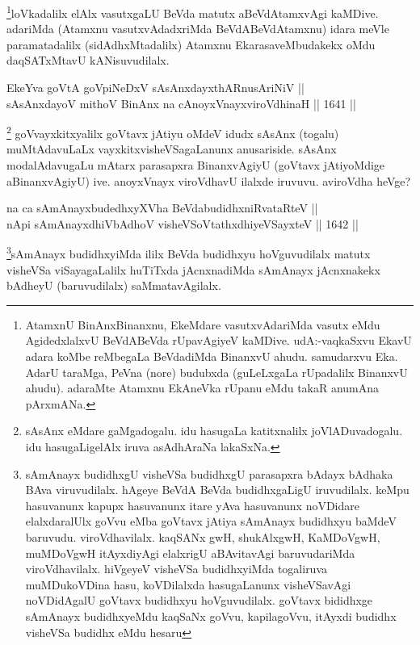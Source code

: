 \begin{artha}
\footnote{AtamxnU BinAnxBinanxnu, EkeMdare vasutxvAdariMda vasutx eMdu AgidedxlalxvU BeVdABeVda rUpavAgiyeV kaMDive. udA:-vaqkaSxvu EkavU adara koMbe reMbegaLa BeVdadiMda BinanxvU ahudu. samudarxvu Eka. AdarU taraMga, PeVna (nore) budubxda (guLeLxgaLa rUpadalilx BinanxvU ahudu). adaraMte Atamxnu EkAneVka rUpanu eMdu takaR anumAna pArxmANa.}loVkadalilx elAlx vasutxgaLU BeVda matutx aBeVdAtamxvAgi kaMDive. adariMda (Atamxnu vasutxvAdadxriMda BeVdABeVdAtamxnu) idara meVle paramatadalilx (sidAdhxMtadalilx) Atamxnu EkarasaveMbudakekx oMdu daqSATxMtavU kANisuvudilalx.
\end{artha}


\begin{shl}
EkeYva goVtA goVpiNeDxV sAsAnxdayxthARnusAriNiV || \\
sAsAnxdayoV mithoV BinAnx na cAnoyxVnayxviroVdhinaH ||  1641 ||  
\end{shl}

\begin{artha}
\footnote{sAsAnx eMdare gaMgadogalu. idu hasugaLa katitxnalilx joVlADuvadogalu. idu hasugaLigelAlx iruva asAdhAraNa lakaSxNa.}
goVvayxkitxyalilx goVtavx jAtiyu oMdeV idudx sAsAnx (togalu) muMtAdavuLaLx vayxkitxvisheVSagaLanunx anusariside. sAsAnx modalAdavugaLu mAtarx parasapxra BinanxvAgiyU (goVtavx jAtiyoMdige aBinanxvAgiyU) ive. anoyxVnayx viroVdhavU ilalxde iruvuvu. aviroVdha heVge?
\end{artha}

\begin{shl}
na ca sAmAnayxbudedhxyXVha BeVdabudidhxniRvataRteV || \\
nApi sAmAnayxdhiVbAdhoV visheVSoVtathxdhiyeVSayxteV ||  1642 ||  
\end{shl}

\begin{artha}
\footnote{sAmAnayx budidhxgU visheVSa budidhxgU parasapxra bAdayx bAdhaka BAva viruvudilalx. hAgeye BeVdA BeVda budidhxgaLigU iruvudilalx. keMpu hasuvanunx kapupx hasuvanunx itare yAva hasuvanunx noVDidare elalxdaralUlx goVvu eMba goVtavx jAtiya sAmAnayx budidhxyu baMdeV baruvudu. viroVdhavilalx. kaqSANx gwH, shukAlxgwH, KaMDoVgwH, muMDoVgwH itAyxdiyAgi elalxrigU aBAvitavAgi baruvudariMda viroVdhavilalx. hiVgeyeV visheVSa budidhxyiMda togaliruva muMDukoVDina hasu, koVDilalxda hasugaLanunx visheVSavAgi noVDidAgalU goVtavx budidhxyu hoVguvudilalx. goVtavx bididhxge sAmAnayx budidhxyeMdu kaqSaNx goVvu, kapilagoVvu, itAyxdi budidhx visheVSa budidhx eMdu hesaru}sAmAnayx budidhxyiMda ililx BeVda budidhxyu hoVguvudilalx matutx visheVSa viSayagaLalilx huTiTxda jAcnxnadiMda sAmAnayx jAcnxnakekx bAdheyU (baruvudilalx) saMmatavAgilalx.
\end{artha}

